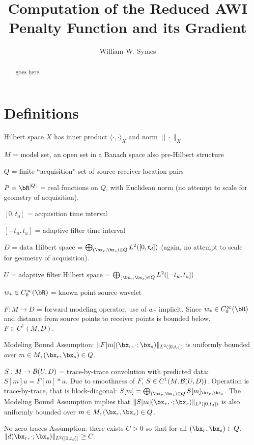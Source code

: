 \title{Computation of the Reduced AWI Penalty Function and its Gradient}
\author{William W. Symes}

\begin{abstract}
goes here.
\end{abstract}

\section{Definitions}
Hilbert space $X$ has inner product $\langle \cdot,\cdot \rangle_X$ and norm $\|\cdot\|_X$.

$M$ = model set, an open set in a Banach space also pre-Hilbert structure 

$Q$ = finite ``acquisition'' set of source-receiver location pairs

$P = \bR^{|Q|}$ = real functions on $Q$, with Euclidean norm (no attempt to scale for geometry of acquisition).

$[0,t_d]$ = acquisition time interval

$[-t_u,t_u]$ = adaptive filter time interval

$D$ = data Hilbert space = $\bigoplus_{(\bx_r,\bx_s) \in Q} L^2([0,t_d])$ (again, no attempt to scale for geometry of acquisition).

$U$ = adaptive filter Hilbert space = $\bigoplus_{(\bx_r,\bx_s) \in Q} L^2([-t_u,t_u])$

$w_* \in C_0^{\infty}(\bR)$ = known point source wavelet

$F: M \rightarrow D$ = forward modeling operator, use of $w_*$ implicit. Since $w_*\in C_0^{\infty}(\bR)$  and distance from source points to receiver points is bounded below, $F \in C^1(M,D)$.

Modeling Bound Assumption: $\|F[m](\bx_r,\cdot;\bx_s)\|_{L^2([0,t_d])}$ is uniformly bounded over $m \in M, (\bx_r,\bx_s) \in Q$.

$S: M \rightarrow {\cal B}(U,D)$ = trace-by-trace convolution with predicted data: $S[m]u = F[m] * u$. Due to smoothness of $F$, $S \in C^1(M,{\cal B}(U,D))$. Operation is trace-by-trace, that is block-diagonal: $S[m] = \bigoplus_{(\bx_r,\bx_s) \in Q}S[m]_{\bx_r,\bx_s}$. The Modeling Bound Assumption implies that $\|S[m](\bx_r,\cdot;\bx_s)\|_{L^2([0,t_d])}$ is also uniformly bounded over $m \in M, (\bx_r,\bx_s) \in Q$.

No-zero-traces Assumption: there exists $C>0$ so that for all $(\bx_r,\bx_s) \in Q$,
$\|d(\bx_r,\cdot;\bx_s)\|_{L^2([0,t_d])} \ge C.$

